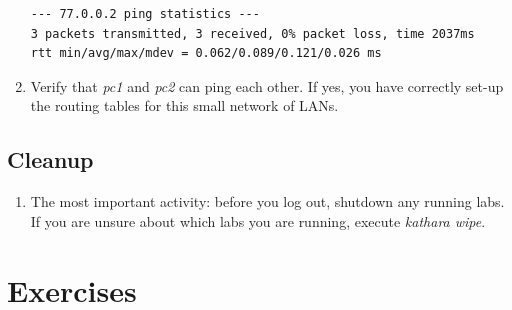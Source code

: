 \documentclass[12pt]{book}
\begin{document}
\begin{enumerate}[resume*]
\begin{lstlisting}
--- 77.0.0.2 ping statistics ---
3 packets transmitted, 3 received, 0% packet loss, time 2037ms
rtt min/avg/max/mdev = 0.062/0.089/0.121/0.026 ms
  \end{lstlisting}

  \item Verify that \emph{pc1} and \emph{pc2} can ping each other. If yes, you have correctly set-up the routing tables for this small network of LANs.
\end{enumerate}

\subsection{Cleanup}

\begin{enumerate}[resume*]
\item The most important activity: before you log out, shutdown any running labs. If you are unsure about which labs you are running, execute \emph{kathara wipe}.
\end{enumerate}


\section{Exercises}
\end{document}
